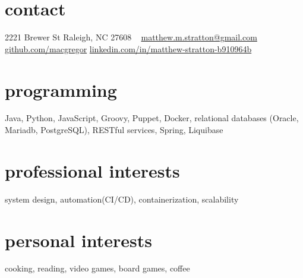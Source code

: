 
\begin{aside} %
\section{contact}
2221 Brewer St
Raleigh, NC 27608
~
\href{mailto:matthew.m.stratton@gmail.com}{\small{matthew.m.stratton@gmail.com}}
\href{https://github.com/macgregor}{github.com/macgregor}
\href{https://www.linkedin.com/in/matthew-stratton-b910964b}{\small{linkedin.com/in/matthew-stratton-b910964b}}
\section{programming}
Java, Python, JavaScript, Groovy, Puppet, Docker, relational databases (Oracle, Mariadb, PostgreSQL), RESTful services, Spring, Liquibase
\section{professional interests}
system design, automation(CI/CD), containerization, scalability
~
\section{personal interests}
 cooking, reading, video games, board games, coffee
\end{aside}
